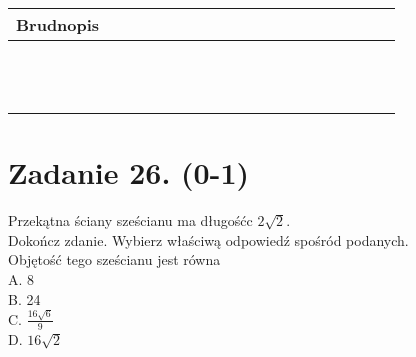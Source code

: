 \documentclass[10pt]{article}
\begin{document}
\begin{center}
\begin{tabular}{|c|c|c|c|c|c|c|c|c|c|c|c|c|c|c|c|c|c|c|c|c|c|}
\hline
\multicolumn{4}{|l|}{Brudnopis} &  &  &  &  &  &  &  &  &  &  &  &  &  &  &  &  &  &  \\
\hline
 &  &  &  &  &  &  &  &  &  &  &  &  &  &  &  &  &  &  &  &  &  \\
\hline
 &  &  &  &  &  &  &  &  &  &  &  &  &  &  &  &  &  &  &  &  &  \\
\hline
 &  &  &  &  &  &  &  &  &  &  &  &  &  &  &  &  &  &  &  &  &  \\
\hline
 &  &  &  &  &  &  &  &  &  &  &  &  &  &  &  &  &  &  &  &  &  \\
\hline
 &  &  &  &  &  &  &  &  &  &  &  &  &  &  &  &  &  &  &  &  &  \\
\hline
 &  &  &  &  &  &  &  &  &  &  &  &  &  &  &  &  &  &  &  &  &  \\
\hline
 &  &  &  &  &  &  &  &  &  &  &  &  &  &  &  &  &  &  &  &  &  \\
\hline
 &  &  &  &  &  &  &  &  &  &  &  &  &  &  &  &  &  &  &  &  &  \\
\hline
 &  &  &  &  &  &  &  &  &  &  &  &  &  &  &  &  &  &  &  &  &  \\
\hline
 &  &  &  &  &  &  &  &  &  &  &  &  &  &  &  &  &  &  &  &  &  \\
\hline
 &  &  &  &  &  &  &  &  &  &  &  &  &  &  &  &  &  &  &  &  &  \\
\hline
 &  &  &  &  &  &  &  &  &  &  &  &  &  &  &  &  &  &  &  &  &  \\
\hline
\end{tabular}
\end{center}

\section*{Zadanie 26. (0-1)}
Przekątna ściany sześcianu ma długośćc \(2 \sqrt{2}\).\\
Dokończ zdanie. Wybierz właściwą odpowiedź spośród podanych.\\
Objętość tego sześcianu jest równa\\
A. 8\\
B. 24\\
C. \(\frac{16 \sqrt{6}}{9}\)\\
D. \(16 \sqrt{2}\)
\end{document}

